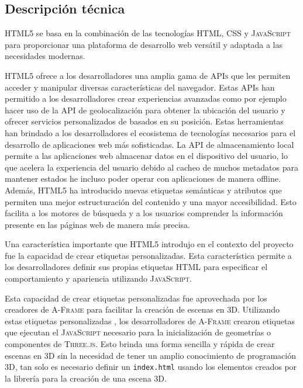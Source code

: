 \documentclass[a4paper, 11pt]{book}
\begin{document}
\subsection{Descripción técnica}
\textsc{HTML5} se basa en la combinación de las tecnologías \textsc{HTML}, \textsc{CSS} y \textsc{JavaScript} para proporcionar una plataforma de desarrollo web versátil y adaptada a las necesidades modernas. 

\textsc{HTML5} ofrece a los desarrolladores una amplia gama de \textsc{APIs} que les permiten acceder y manipular diversas características del navegador. 
Estas APIs han permitido a los desarrolladores crear experiencias avanzadas como por ejemplo hacer uso de la \gls{API} de geolocalización para obtener la ubicación del usuario y ofrecer servicios personalizados de basados en su posición. Estas herramientas han brindado a los desarrolladores el ecosistema de tecnologías necesarios para el desarrollo de aplicaciones web más sofisticadas.
La \textsc{API} de almacenamiento local permite a las aplicaciones web almacenar datos en el dispositivo del usuario, lo que acelera la experiencia del usuario debido al cacheo de muchos metadatos para mantener estados he incluso poder operar con aplicaciones de manera offline.
Además, \textsc{HTML5} ha introducido nuevas etiquetas semánticas y atributos que permiten una mejor estructuración del contenido y una mayor accesibilidad. Esto facilita a los motores de búsqueda y a los usuarios comprender la información presente en las páginas web de manera más precisa.

Una característica importante que \textsc{HTML5} introdujo en el contexto del proyecto fue la capacidad de crear etiquetas personalizadas. Esta característica permite a los desarrolladores definir sus propias etiquetas \textsc{HTML} para especificar el comportamiento y apariencia utilizando \textsc{JavaScript}.

Esta capacidad de crear etiquetas personalizadas fue aprovechada por los creadores de \textsc{A-Frame} para facilitar la creación de escenas en \textsc{3D}. Utilizando estas etiquetas personalizadas \cite{aframedocs}, los desarrolladores de \textsc{A-Frame} crearon etiquetas que ejecutan el \textsc{JavaScript} necesario para la inicialización de geometrías o componentes de \textsc{Three.js}\cite{threejs}. Esto brinda una forma sencilla y rápida de crear escenas en 3D sin la necesidad de tener un amplio conocimiento de programación 3D, tan solo es necesario definir un \texttt{index.html} usando los elementos creados por la librería para la creación de una escena \textsc{3D}.
\end{document}

